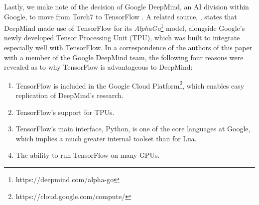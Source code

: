 Lastly, we make note of the decision of Google DeepMind, an AI division within
Google, to move from Torch7 to TensorFlow \cite{deepmind}. A related source,
\cite{tpu}, states that DeepMind made use of TensorFlow for its
\emph{AlphaGo}\footnote{https://deepmind.com/alpha-go} model, alongside Google's
newly developed Tensor Processing Unit (TPU), which was built to integrate
especially well with TensorFlow. In a correspondence of the authors of this
paper with a member of the Google DeepMind team, the following four reasons were
revealed as to why TensorFlow is advantageous to DeepMind:

\begin{enumerate}
\item TensorFlow is included in the Google Cloud
  Platform\footnote{https://cloud.google.com/compute/}, which enables easy
  replication of DeepMind's research.
\item TensorFlow's support for TPUs.
\item TensorFlow's main interface, Python, is one of the core languages at
  Google, which implies a much greater internal toolset than for Lua.
\item The ability to run TensorFlow on many GPUs.
\end{enumerate}

